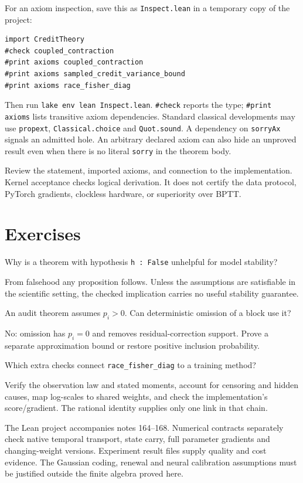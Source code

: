 \documentclass[11pt]{article}
\begin{document}
For an axiom inspection, save this as \texttt{Inspect.lean} in a temporary copy of the project:
\begin{verbatim}
import CreditTheory
#check coupled_contraction
#print axioms coupled_contraction
#print axioms sampled_credit_variance_bound
#print axioms race_fisher_diag
\end{verbatim}
Then run \texttt{lake env lean Inspect.lean}. \texttt{\#check} reports the type; \texttt{\#print axioms} lists transitive axiom dependencies. Standard classical developments may use \texttt{propext}, \texttt{Classical.choice} and \texttt{Quot.sound}. A dependency on \texttt{sorryAx} signals an admitted hole. An arbitrary declared axiom can also hide an unproved result even when there is no literal \texttt{sorry} in the theorem body.
\begin{keyidea}
Review the statement, imported axioms, and connection to the implementation. Kernel acceptance checks logical derivation. It does not certify the data protocol, PyTorch gradients, clockless hardware, or superiority over BPTT.
\end{keyidea}
\section*{Exercises}
\begin{exercise}Why is a theorem with hypothesis \texttt{h : False} unhelpful for model stability?\end{exercise}
\begin{solution}From falsehood any proposition follows. Unless the assumptions are satisfiable in the scientific setting, the checked implication carries no useful stability guarantee.\end{solution}
\begin{exercise}An audit theorem assumes $p_i>0$. Can deterministic omission of a block use it?\end{exercise}
\begin{solution}No: omission has $p_i=0$ and removes residual-correction support. Prove a separate approximation bound or restore positive inclusion probability.\end{solution}
\begin{exercise}Which extra checks connect \texttt{race\_\allowbreak{}fisher\_\allowbreak{}diag} to a training method?\end{exercise}
\begin{solution}Verify the observation law and stated moments, account for censoring and hidden causes, map log-scales to shared weights, and check the implementation's score/gradient. The rational identity supplies only one link in that chain.\end{solution}
\begin{inourmodels}
The Lean project accompanies notes 164--168. Numerical contracts separately check native temporal transport, state carry, full parameter gradients and changing-weight versions. Experiment result files supply quality and cost evidence. The Gaussian coding, renewal and neural calibration assumptions must be justified outside the finite algebra proved here.
\end{inourmodels}
\end{document}
